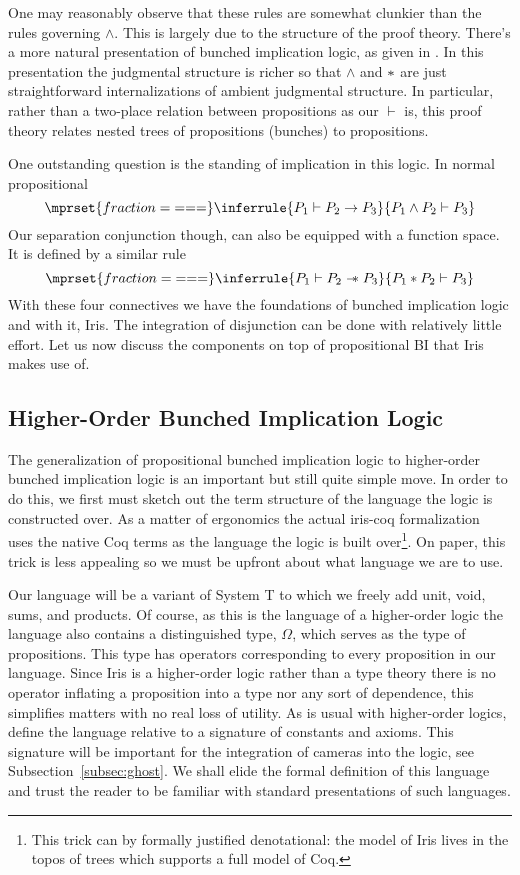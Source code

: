 \documentclass{amsart}
\newcommand{\limplies}{\to}
\begin{document}
One may reasonably observe that these rules are somewhat clunkier than
the rules governing $\land$. This is largely due to the structure of
the proof theory. There's a more natural presentation of bunched
implication logic, as given in \citet{OHearn:99}. In this presentation
the judgmental structure is richer so that $\land$ and $\ast$ are just
straightforward internalizations of ambient judgmental structure. In
particular, rather than a two-place relation between propositions as
our $\vdash$ is, this proof theory relates nested trees of
propositions (bunches) to propositions.

One outstanding question is the standing of implication in this
logic. In normal propositional
\[
  \mprset{fraction={===}}
  \inferrule{
    P_1 \vdash P_2 \limplies P_3
  }{P_1 \land P_2 \vdash P_3}
\]
Our separation conjunction though, can also be equipped with a
function space. It is defined by a similar rule
\[
  \mprset{fraction={===}}
  \inferrule{
    P_1 \vdash P_2 \wand P_3
  }{P_1 \sep P_2 \vdash P_3}
\]
With these four connectives we have the foundations of bunched
implication logic and with it, Iris. The integration of disjunction
can be done with relatively little effort. Let us now discuss the
components on top of propositional BI that Iris makes use of.

\subsection{Higher-Order Bunched Implication Logic}\label{subsec:hol}

The generalization of propositional bunched implication logic to
higher-order bunched implication logic is an important but still quite
simple move. In order to do this, we first must sketch out the term
structure of the language the logic is constructed over. As a matter
of ergonomics the actual iris-coq formalization~\citep{iris-coq} uses
the native Coq terms as the language the logic is built
over\footnote{This trick can by formally justified denotational: the
  model of Iris lives in the topos of trees which supports a full
  model of Coq.}. On paper, this trick is less appealing so we must be
upfront about what language we are to use.

Our language will be a variant of System T to which we freely add
unit, void, sums, and products. Of course, as this is the language of
a higher-order logic the language also contains a distinguished type,
$\Omega$, which serves as the type of propositions. This type has
operators corresponding to every proposition in our language. Since
Iris is a higher-order logic rather than a type theory there is no
operator inflating a proposition into a type nor any sort of
dependence, this simplifies matters with no real loss of utility. As
is usual with higher-order logics, define the language relative to a
signature of constants and axioms. This signature will be important
for the integration of cameras into the logic, see
Subsection~\ref{subsec:ghost}. We shall elide the formal definition of
this language and trust the reader to be familiar with standard
presentations of such languages.
\end{document}
